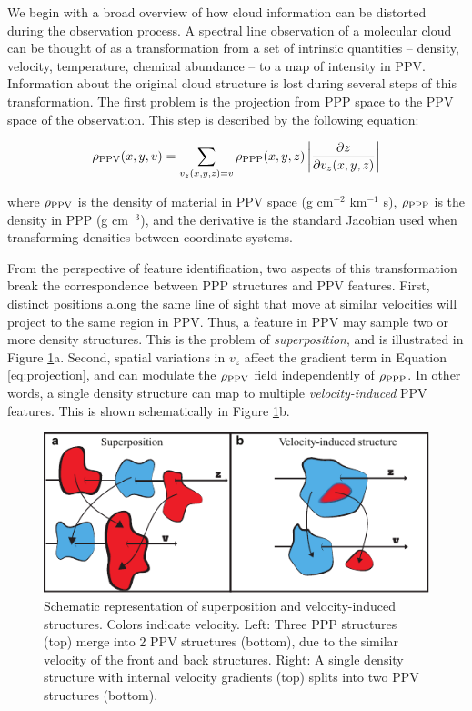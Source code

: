 We begin with
a broad overview of how cloud information can be distorted during the observation process.
A spectral line observation of a molecular cloud can be thought of as a
transformation from a set of intrinsic quantities  -- density, velocity,
temperature, chemical abundance --  to a map of intensity in PPV.
Information about the original cloud structure is lost during several
steps of this transformation. The first problem is the projection from
PPP space to the PPV space
of the observation. This step is described by the following equation:

\begin{equation}
\rho_{\rm PPV}(x, y, v) = \sum_{v_z(x, y, z) = v} \rho_{\rm PPP} (x, y, z) \left| \frac{\partial z}{\partial v_z(x, y, z)} \right|
\label{eq:projection}
\end{equation}

where $\rho_{\rm PPV}$ is the density of material in PPV space (g cm$^{-2}$ km$^{-1}$ s), $\rho_{\rm PPP}$ is the density in PPP (g cm$^{-3}$),
and the derivative is the standard Jacobian used when transforming densities between coordinate systems.

From the perspective of feature identification, two aspects of this transformation
break the correspondence between
PPP structures and PPV features. First, distinct positions along the
same line of sight that move at similar velocities will project to the
same region in PPV. Thus, a feature in PPV may sample
two or more density structures. This is the problem of \textit{superposition}, and is illustrated in Figure \ref{fig:schematic_ch5_ppv}a.
Second, spatial variations in $v_z$ affect
the gradient term in Equation \ref{eq:projection}, and can modulate the $\rho_{\rm PPV}$ field independently of $\rho_{\rm PPP}$.
In other words, a single density structure can map to multiple \textit{velocity-induced} PPV features. This is shown schematically
in Figure \ref{fig:schematic_ch5_ppv}b.

\begin{figure}[h!]
\includegraphics[width=5in]{figures/schematic}
\caption{Schematic representation of superposition and velocity-induced structures. Colors indicate velocity. Left: Three PPP structures (top) merge into 2 PPV structures (bottom), due to the similar velocity of the front and back structures. Right: A single density structure with internal velocity gradients (top) splits into two PPV structures (bottom).}
\label{fig:schematic_ch5_ppv}
\end{figure}

